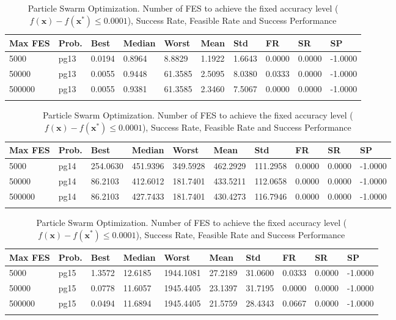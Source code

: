 \documentclass[10pt, a4paper]{book}
\begin{document}
\begin{center}
\begin{longtable}{l l l l l l l l l l}
\textbf{Max FES} & \textbf{Prob.} & \textbf{Best} & \textbf{Median} & \textbf{Worst} & \textbf{Mean} & \textbf{Std} & \textbf{FR} & \textbf{SR} & \textbf{SP} \\
\hline
5000 & pg13 & 0.0194 & 0.8964 & 8.8829 & 1.1922 & 1.6643 & 0.0000 & 0.0000 & -1.0000 \\
50000 & pg13 & 0.0055 & 0.9448 & 61.3585 & 2.5095 & 8.0380 & 0.0333 & 0.0000 & -1.0000 \\
500000 & pg13 & 0.0055 & 0.9381 & 61.3585 & 2.3460 & 7.5067 & 0.0000 & 0.0000 & -1.0000 \\

\caption{ Particle Swarm Optimization. Number of FES to achieve the fixed accuracy level ($f(\mathbf{x}) - f(\mathbf{x}^{*}) \leq 0.0001$), Success Rate, Feasible Rate and Success Performance }
\end{longtable}
\end{center}

\begin{center}
\begin{longtable}{l l l l l l l l l l}
\textbf{Max FES} & \textbf{Prob.} & \textbf{Best} & \textbf{Median} & \textbf{Worst} & \textbf{Mean} & \textbf{Std} & \textbf{FR} & \textbf{SR} & \textbf{SP} \\
\hline
5000 & pg14 & 254.0630 & 451.9396 & 349.5928 & 462.2929 & 111.2958 & 0.0000 & 0.0000 & -1.0000 \\
50000 & pg14 & 86.2103 & 412.6012 & 181.7401 & 433.5211 & 112.0658 & 0.0000 & 0.0000 & -1.0000 \\
500000 & pg14 & 86.2103 & 427.7433 & 181.7401 & 430.4273 & 116.7946 & 0.0000 & 0.0000 & -1.0000 \\

\caption{ Particle Swarm Optimization. Number of FES to achieve the fixed accuracy level ($f(\mathbf{x}) - f(\mathbf{x}^{*}) \leq 0.0001$), Success Rate, Feasible Rate and Success Performance }
\end{longtable}
\end{center}

\begin{center}
\begin{longtable}{l l l l l l l l l l}
\textbf{Max FES} & \textbf{Prob.} & \textbf{Best} & \textbf{Median} & \textbf{Worst} & \textbf{Mean} & \textbf{Std} & \textbf{FR} & \textbf{SR} & \textbf{SP} \\
\hline
5000 & pg15 & 1.3572 & 12.6185 & 1944.1081 & 27.2189 & 31.0600 & 0.0333 & 0.0000 & -1.0000 \\
50000 & pg15 & 0.0778 & 11.6057 & 1945.4405 & 23.1397 & 31.7195 & 0.0000 & 0.0000 & -1.0000 \\
500000 & pg15 & 0.0494 & 11.6894 & 1945.4405 & 21.5759 & 28.4343 & 0.0667 & 0.0000 & -1.0000 \\

\caption{ Particle Swarm Optimization. Number of FES to achieve the fixed accuracy level ($f(\mathbf{x}) - f(\mathbf{x}^{*}) \leq 0.0001$), Success Rate, Feasible Rate and Success Performance }
\end{longtable}
\end{center}
\end{document}
